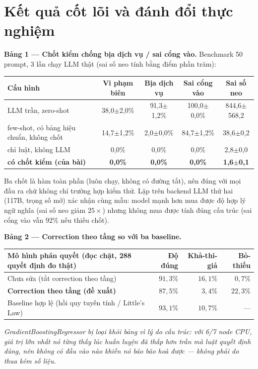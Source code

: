 \documentclass[11pt,a4paper]{article}
\newcommand{\sotrong}[1]{\textbf{#1}}
\begin{document}
\section{Kết quả cốt lõi và đánh đổi thực nghiệm}\label{sec:ketquacotloi}

\textbf{Bảng 1 --- Chốt kiểm chống bịa dịch vụ / sai cổng vào.} Benchmark 50
prompt, 3 lần chạy LLM thật (sai số neo tính bằng điểm phần trăm):
\begin{center}\footnotesize
\begin{tabular}{lcccc}
\toprule Cấu hình & Vi phạm biên & Bịa dịch vụ & Sai cổng vào & Sai số neo \\ \midrule
LLM trần, zero-shot & 38,0$\pm$2,0\% & 91,3$\pm$1,2\% & 100,0$\pm$0,0\% & 844,6$\pm$568,2 \\
few-shot, có bảng hiệu chuẩn, không chốt & 14,7$\pm$1,2\% & 2,0$\pm$0,0\% & 84,7$\pm$1,2\% & 38,6$\pm$0,2 \\
chỉ luật, không LLM & 0,0\% & 0,0\% & 0,0\% & 2,8$\pm$0,0 \\
\textbf{có chốt kiểm (của bài)} & \sotrong{0,0\%} & \sotrong{0,0\%} & \sotrong{0,0\%} & \sotrong{1,6$\pm$0,1} \\ \bottomrule
\end{tabular}\end{center}
Ba chốt là hàm toàn phần (luôn chạy, không có đường tắt), nên đúng với mọi đầu ra
chứ không chỉ trường hợp kiểm thử. Lặp trên backend LLM thứ hai (117B, trọng số
mở) xác nhận cùng mẫu: model mạnh hơn mua được độ hợp lý ngữ nghĩa (sai số neo
giảm $25\times$) nhưng không mua được tính đúng cấu trúc (sai cổng vào vẫn
$92\%$ nếu thiếu chốt).

\textbf{Bảng 2 --- Correction theo tầng so với ba baseline.}
\begin{center}\small
\begin{tabular}{lrrr}
\toprule Mô hình phán quyết (đọc chặt, 288 quyết định đo thật) & Độ đúng & Khả-thi-giả & Bỏ-thiếu \\ \midrule
Chưa sửa (tắt correction theo tầng) & $91,3\%$ & $16,1\%$ & $0,7\%$ \\
\textbf{Correction theo tầng (đề xuất)} & $87,5\%$ & \sotrong{$3,4\%$} & $22,3\%$ \\
Baseline hợp lệ (hồi quy tuyến tính / Little's Law) & \sotrong{$93,1\%$} & $10,7\%$ & --- \\ \bottomrule
\end{tabular}\end{center}
\emph{GradientBoostingRegressor bị loại khỏi bảng vì lý do cấu trúc: với 6/7 node
CPU, giá trị lớn nhất nó từng thấy lúc huấn luyện đã thấp hơn trần mà luật quyết
định dùng, nên không có đầu vào nào khiến nó báo bão hoà được --- không phải do
thua kém số liệu.}
\end{document}
